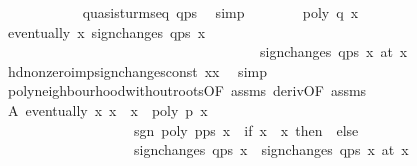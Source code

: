 \begin{isabellebody}
\ \ \ \ \ \ \ \ \ \ \isamarkupfalse%
\ quasi{\isacharunderscore}sturm{\isacharunderscore}seq\ {\isachardoublequoteopen}q{\isacharhash}ps{\isacharprime}{\isachardoublequoteclose}\ \isamarkupfalse%
\ simp\isanewline
\ \ \ \ \ \ \isamarkupfalse%
\ {\isacharbackquoteopen}poly\ q\ x\ {\isasymnoteq}\ {}{\isacharbackquoteclose}\ \isamarkupfalse%
\ {\isachardoublequoteopen}eventually\ {\isacharparenleft}{\isasymlambda}x{\isachardot}\ sign{\isacharunderscore}changes\ {\isacharparenleft}q{\isacharhash}ps{\isacharprime}{\isacharparenright}\ x\ {\isacharequal}\ \isanewline
\ \ \ \ \ \ \ \ \ \ \ \ \ \ \ \ \ \ \ \ \ \ \ \ \ \ \ \ \ \ \ \ \ \ \ \ \ sign{\isacharunderscore}changes\ {\isacharparenleft}q{\isacharhash}ps{\isacharprime}{\isacharparenright}\ x\ {\isacharparenleft}at\ x\isanewline
\ \ \ \ \ \ \isamarkupfalse%
\ hd{\isacharunderscore}nonzero{\isacharunderscore}imp{\isacharunderscore}sign{\isacharunderscore}changes{\isacharunderscore}const{\isacharbrackleft}\ xx\ \isamarkupfalse%
\ simp\isanewline
\ \ \isacommand{{\isacharbraceright}}\isamarkupfalse%
\ \ \ \isanewline
\ \ \isamarkupfalse%
\ \isamarkupfalse%
\ poly{\isacharunderscore}neighbourhood{\isacharunderscore}without{\isacharunderscore}roots{\isacharbrackleft}OF\ assms{\isacharparenleft}{}{\isacharparenright}{\isacharbrackright}\ deriv{\isacharbrackleft}OF\ assms{\isacharparenleft}{}{\isacharparenright}{\isacharbrackright}\isanewline
\ \ \isamarkupfalse%
\isanewline
\ \ \ \ \ \ \isamarkupfalse%
\ A{\isacharcolon}\ {\isachardoublequoteopen}eventually\ {\isacharparenleft}{\isasymlambda}x{\isachardot}\ x\ {\isasymnoteq}\ x\ {\isasymand}\ poly\ p\ x\ {\isasymnoteq}\ {}\ {\isasymand}\isanewline
\ \ \ \ \ \ \ \ \ \ \ \ \ \ \ \ \ \ \ sgn\ {\isacharparenleft}poly\ {\isacharparenleft}p{\isacharasterisk}ps{\isacharbang}{}{\isacharparenright}\ x{\isacharparenright}\ {\isacharequal}\ {\isacharparenleft}if\ x\ {\isachargreater}\ x\ then\ {}\ else\ {\isacharminus}{}{\isacharparenright}\ {\isasymand}\isanewline
\ \ \ \ \ \ \ \ \ \ \ \ \ \ \ \ \ \ \ sign{\isacharunderscore}changes\ {\isacharparenleft}q{\isacharhash}ps{\isacharprime}{\isacharparenright}\ x\ {\isacharequal}\ sign{\isacharunderscore}changes\ {\isacharparenleft}q{\isacharhash}ps{\isacharprime}{\isacharparenright}\ x\ {\isacharparenleft}at\ x\ \isanewline

\end{isabellebody}
